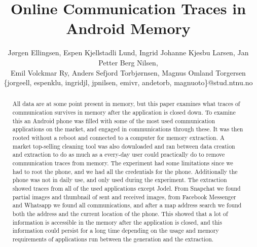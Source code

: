 \documentclass[10pt]{sig-alternate-05-2015}
\begin{document}
\title{Online Communication Traces in Android Memory}

\author{
J{\o}rgen Ellingsen, Espen Kjellstadli Lund, Ingrid Johanne Kjesbu Larsen, Jan Petter Berg Nilsen,\\
Emil Volckmar Ry, Anders Sefjord Torbj{\o}rnsen, Magnus Omland Torgersen
\\\{jorgeell, espenklu, ingridjl, jpnilsen, emivr, andetorb, magnuoto\}@stud.ntnu.no
}

\maketitle
\begin{abstract}
All data are at some point present in memory, but this paper examines what traces of communication survives in memory after the application is closed down. To examine this an Android phone was filled with some of the most used communication applications on the market, and engaged in communications through these. It was then rooted without a reboot and connected to a computer for memory extraction. A market top-selling cleaning tool was also downloaded and ran between data creation and extraction to do as much as a every-day user could practically do to remove communication traces from memory. The experiment had some limitations since we had to root the phone, and we had all the credentials for the phone. Additionally the phone was not in daily use, and only used during the experiment. The extraction showed traces from all of the used applications except Jodel. From Snapchat we found partial images and thumbnail of sent and received images, from Facebook Messenger and Whatsapp we found all communications, and after a map address search we found both the address and the current location of the phone. This showed that a lot of information is accessible in the memory after the application is closed, and this information could persist for a long time depending on the usage and memory requirements of applications run between the generation and the extraction. 
\end{abstract}
















  
\end{document}
